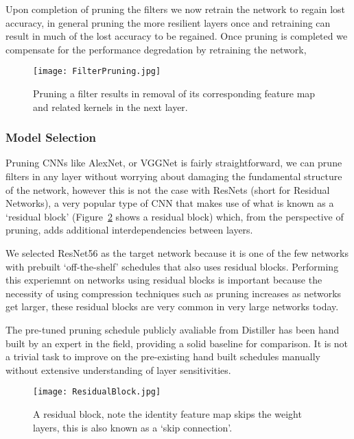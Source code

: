 \documentclass[../Dissertation.tex]{subfiles}
\begin{document}
\noindent Upon completion of pruning the filters we now retrain the network to regain lost accuracy, in general pruning the more resilient layers once and retraining can result in much of the lost accuracy to be regained.
Once pruning is completed we compensate for the performance degredation by retraining the network, 

    \begin{figure}[H]
        \texttt{[image: FilterPruning.jpg]}
        \caption{Pruning a filter results in removal of its corresponding feature map and related kernels in the next layer.~\autocite{liPruningFiltersEfficient2017}}
        \label{fig:FeaturemapAndKernel}
    \end{figure}




\subsubsection{Model Selection}\label{sec:ModelSelection}

Pruning CNNs like AlexNet, or VGGNet is fairly straightforward, we can prune filters in any layer without worrying about damaging the fundamental structure of the network, however this is not the case with ResNets (short for Residual Networks),  a very popular type of CNN that makes use of what is known as a `residual block' (Figure~\ref{fig:ResidualBlock} shows a residual block) which, from the perspective of pruning, adds additional interdependencies between layers.

We selected ResNet56 as the target network because it is one of the few networks with prebuilt `off-the-shelf' schedules that also uses residual blocks. 
Performing this experiemnt on networks using residual blocks is important because the necessity of using compression techniques such as pruning increases as networks get larger, these residual blocks are very common in very large networks today. 

The pre-tuned pruning schedule publicly avaliable from Distiller has been hand built by an expert in the field, providing a solid baseline for comparison.
It is not a trivial task to improve on the pre-existing hand built schedules manually without extensive understanding of layer sensitivities.  

\begin{figure}[H]
    \centering
    \texttt{[image: ResidualBlock.jpg]}
    \caption{A residual block, note the identity feature map skips the weight layers, this is also known as a `skip connection'.}
    \label{fig:ResidualBlock}
\end{figure}
\end{document}
